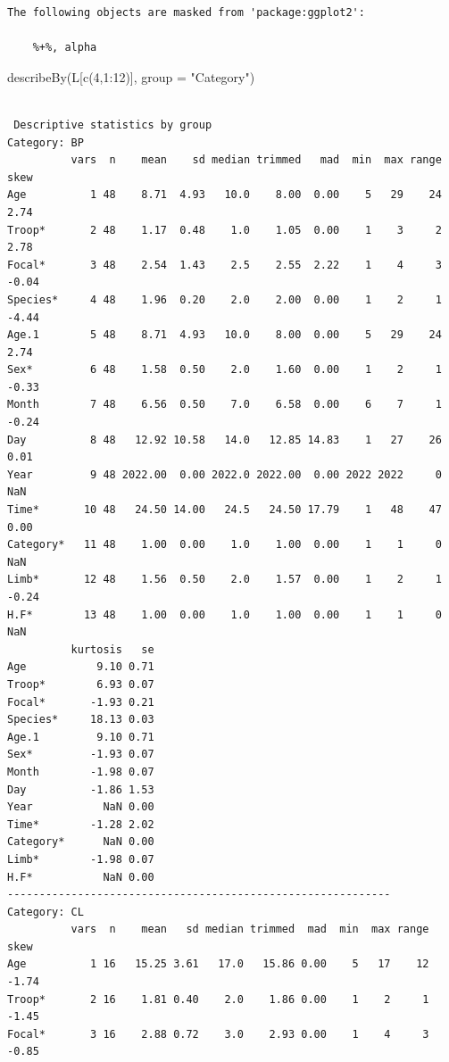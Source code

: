 \documentclass[
  letterpaper,
  DIV=11,
  numbers=noendperiod]{scrartcl}
\newenvironment{Shaded}{\begin{snugshade}}{\end{snugshade}}
\newcommand{\AttributeTok}[1]{\textcolor[rgb]{0.40,0.45,0.13}{#1}}
\newcommand{\DecValTok}[1]{\textcolor[rgb]{0.68,0.00,0.00}{#1}}
\newcommand{\FunctionTok}[1]{\textcolor[rgb]{0.28,0.35,0.67}{#1}}
\newcommand{\NormalTok}[1]{\textcolor[rgb]{0.00,0.23,0.31}{#1}}
\newcommand{\SpecialCharTok}[1]{\textcolor[rgb]{0.37,0.37,0.37}{#1}}
\newcommand{\StringTok}[1]{\textcolor[rgb]{0.13,0.47,0.30}{#1}}
\begin{document}
\begin{verbatim}
The following objects are masked from 'package:ggplot2':

    %+%, alpha
\end{verbatim}

\begin{Shaded}
\begin{Highlighting}[]
\FunctionTok{describeBy}\NormalTok{(L[}\FunctionTok{c}\NormalTok{(}\DecValTok{4}\NormalTok{,}\DecValTok{1}\SpecialCharTok{:}\DecValTok{12}\NormalTok{)], }\AttributeTok{group =} \StringTok{"Category"}\NormalTok{)}
\end{Highlighting}
\end{Shaded}

\begin{verbatim}

 Descriptive statistics by group 
Category: BP
          vars  n    mean    sd median trimmed   mad  min  max range  skew
Age          1 48    8.71  4.93   10.0    8.00  0.00    5   29    24  2.74
Troop*       2 48    1.17  0.48    1.0    1.05  0.00    1    3     2  2.78
Focal*       3 48    2.54  1.43    2.5    2.55  2.22    1    4     3 -0.04
Species*     4 48    1.96  0.20    2.0    2.00  0.00    1    2     1 -4.44
Age.1        5 48    8.71  4.93   10.0    8.00  0.00    5   29    24  2.74
Sex*         6 48    1.58  0.50    2.0    1.60  0.00    1    2     1 -0.33
Month        7 48    6.56  0.50    7.0    6.58  0.00    6    7     1 -0.24
Day          8 48   12.92 10.58   14.0   12.85 14.83    1   27    26  0.01
Year         9 48 2022.00  0.00 2022.0 2022.00  0.00 2022 2022     0   NaN
Time*       10 48   24.50 14.00   24.5   24.50 17.79    1   48    47  0.00
Category*   11 48    1.00  0.00    1.0    1.00  0.00    1    1     0   NaN
Limb*       12 48    1.56  0.50    2.0    1.57  0.00    1    2     1 -0.24
H.F*        13 48    1.00  0.00    1.0    1.00  0.00    1    1     0   NaN
          kurtosis   se
Age           9.10 0.71
Troop*        6.93 0.07
Focal*       -1.93 0.21
Species*     18.13 0.03
Age.1         9.10 0.71
Sex*         -1.93 0.07
Month        -1.98 0.07
Day          -1.86 1.53
Year           NaN 0.00
Time*        -1.28 2.02
Category*      NaN 0.00
Limb*        -1.98 0.07
H.F*           NaN 0.00
------------------------------------------------------------ 
Category: CL
          vars  n    mean   sd median trimmed  mad  min  max range  skew
Age          1 16   15.25 3.61   17.0   15.86 0.00    5   17    12 -1.74
Troop*       2 16    1.81 0.40    2.0    1.86 0.00    1    2     1 -1.45
Focal*       3 16    2.88 0.72    3.0    2.93 0.00    1    4     3 -0.85

\end{verbatim}
\end{document}
